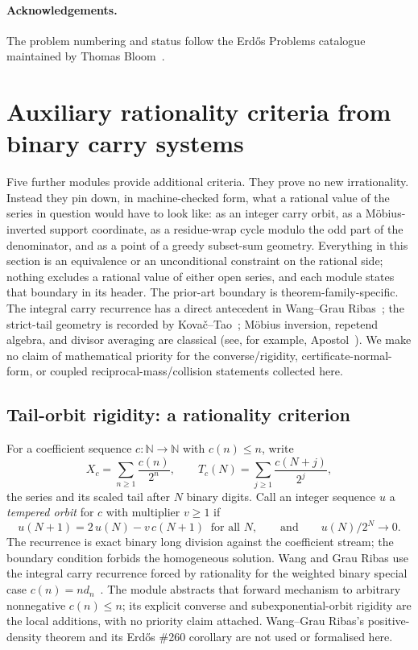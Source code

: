 \documentclass[11pt]{article}
\theoremstyle{definition}
\theoremstyle{remark}
\newcommand{\N}{\mathbb{N}}
\begin{document}
\paragraph{Acknowledgements.} The problem numbering and status follow the
Erd\H{o}s Problems catalogue maintained by Thomas Bloom~\cite{erdosproblems}.

\appendix
\section{Auxiliary rationality criteria from binary carry systems}\label{sec:carry}

Five further modules provide additional criteria. They prove no new
irrationality. Instead they pin down, in machine-checked form, what a rational
value of the series in question would have to look like: as an integer carry
orbit, as a M\"obius-inverted support coordinate, as a residue-wrap cycle
modulo the odd part of the denominator, and as a point of a greedy subset-sum
geometry. Everything in this section is an equivalence or an unconditional
constraint on the rational side; nothing excludes a rational value of either
open series, and each module states that boundary in its header. The prior-art
boundary is theorem-family-specific. The integral carry recurrence has a
direct antecedent in Wang--Grau Ribas~\cite{wanggrauribas}; the strict-tail
geometry is recorded by Kova\v{c}--Tao~\cite{kovactao}; M\"obius inversion,
repetend algebra, and divisor averaging are classical (see, for example,
Apostol~\cite{apostol}). We make no claim of mathematical priority for the
converse/rigidity, certificate-normal-form, or coupled reciprocal-mass/collision
statements collected here.

\subsection{Tail-orbit rigidity: a rationality criterion}

For a coefficient sequence $c:\N\to\N$ with $c(n)\le n$, write
\[
X_c=\sum_{n\ge1}\frac{c(n)}{2^n},
\qquad
T_c(N)=\sum_{j\ge1}\frac{c(N+j)}{2^j},
\]
the series and its scaled tail after $N$ binary digits. Call an integer
sequence $u$ a \emph{tempered orbit} for $c$ with multiplier $v\ge1$ if
\[
u(N+1)=2\,u(N)-v\,c(N+1)\ \text{ for all } N,
\qquad\text{and}\qquad
u(N)/2^N\to0 .
\]
The recurrence is exact binary long division against the coefficient stream;
the boundary condition forbids the homogeneous solution. Wang and Grau Ribas
use the integral carry recurrence forced by rationality for the weighted binary
special case $c(n)=n d_n$~\cite{wanggrauribas}. The module abstracts that
forward mechanism to arbitrary nonnegative $c(n)\le n$; its explicit converse
and subexponential-orbit rigidity are the local additions, with no priority
claim attached. Wang--Grau Ribas's positive-density theorem and its Erd\H{o}s
\#260 corollary are not used or formalised here.
\end{document}
